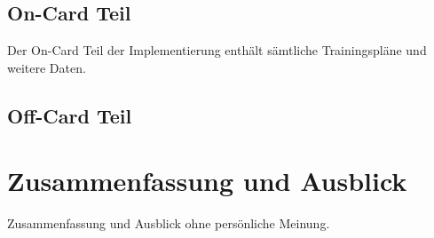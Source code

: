 \documentclass[a4paper,12pt]{scrartcl}
\begin{document}



\subsection{On-Card Teil}
\label{subsec:3.2}
Der On-Card Teil der Implementierung enthält sämtliche Trainingspläne und weitere Daten.




\subsection{Off-Card Teil}
\label{subsec:3.3}


\clearpage
\section{Zusammenfassung und Ausblick}
\label{sec:5}
Zusammenfassung und Ausblick ohne persönliche Meinung.

\clearpage
\end{document}
